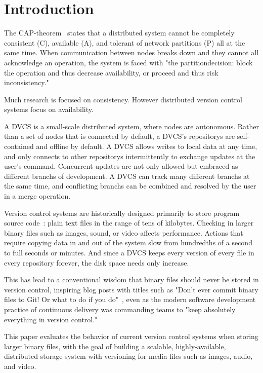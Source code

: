 \section{Introduction}

The \gls{CAP-theorem}~\cite{cap_origin} states that a distributed system cannot be completely consistent (C), available (A), and tolerant of network partitions (P) all at the same time.
When communication between nodes breaks down and they cannot all acknowledge an operation, the system is faced with "the \gls{partitiondecision}: block the operation and thus decrease availability, or proceed and thus risk inconsistency."~\cite{cap_years_later}

Much research is focused on consistency.
However distributed version control systems focus on availability.

A \gls{DVCS} is a small-scale distributed system, where nodes are autonomous.
Rather than a set of nodes that is connected by default, a \gls{DVCS}'s \glspl{repository} are self-contained and offline by default.
A DVCS allows writes to local data at any time, and only connects to other \glspl{repository} intermittently to exchange updates at the user's command.
Concurrent updates are not only allowed but embraced as different \glspl{branch} of development.
A \gls{DVCS} can track many different \glspl{branch} at the same time, and conflicting \glspl{branch} can be combined and resolved by the user in a \gls{merge} operation.

Version control systems are historically designed primarily to store program source code~\cite{history_of_version_control}: plain text files in the range of tens of kilobytes.
Checking in larger binary files such as images, sound, or video affects performance.
Actions that require copying data in and out of the system slow from hundredths of a second to full seconds or minutes.
And since a \gls{DVCS} keeps every version of every file in every \gls{repository} forever, the disk space needs only increase.

This has lead to a conventional wisdom that binary files should never be stored in version control, inspiring blog posts with titles such as
"Don't ever commit binary files to Git! Or what to do if you do"~\cite{dont_ever_commit_binaries_to_version_control},
even as the modern software development practice of continuous delivery was commanding teams to "keep absolutely everything in version control."~\cite[p.33]{continuousdeliverybook}

This paper evaluates the behavior of current version control systems when storing larger binary files, with the goal of building a scalable, highly-available, distributed storage system with versioning for media files such as images, audio, and video.

